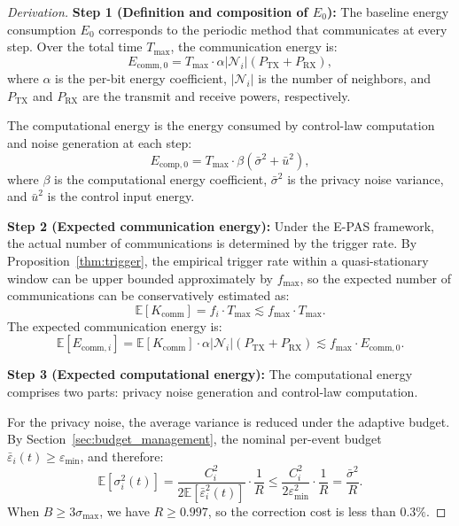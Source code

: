\documentclass[10pt]{article}
\newcommand{\EPAS}{E-PAS}
\newcommand{\fmax}{f_{\max}}
\begin{document}
\begin{proof}[Derivation]
\textbf{Step 1 (Definition and composition of $E_0$):}
The baseline energy consumption $E_0$ corresponds to the periodic method that communicates at every step. Over the total time $T_{\max}$, the communication energy is:
\begin{equation}
  E_{\mathrm{comm},0} = T_{\max} \cdot \alpha|\mathcal{N}_i|(P_{\mathrm{TX}}+P_{\mathrm{RX}}),
\end{equation}
where $\alpha$ is the per-bit energy coefficient, $|\mathcal{N}_i|$ is the number of neighbors, and $P_{\mathrm{TX}}$ and $P_{\mathrm{RX}}$ are the transmit and receive powers, respectively.

The computational energy is the energy consumed by control-law computation and noise generation at each step:
\begin{equation}
  E_{\mathrm{comp},0} = T_{\max} \cdot \beta(\bar{\sigma}^2 + \bar{u}^2),
\end{equation}
where $\beta$ is the computational energy coefficient, $\bar{\sigma}^2$ is the privacy noise variance, and $\bar{u}^2$ is the control input energy.

\textbf{Step 2 (Expected communication energy):}
Under the \EPAS{} framework, the actual number of communications is determined by the trigger rate. By Proposition~\ref{thm:trigger}, the empirical trigger rate within a quasi-stationary window can be upper bounded approximately by $\fmax$, so the expected number of communications can be conservatively estimated as:
\begin{equation}
  \mathbb{E}[K_{\mathrm{comm}}] = f_i \cdot T_{\max} \lesssim \fmax \cdot T_{\max}.
\end{equation}
The expected communication energy is:
\begin{equation}\label{eq:E_comm}
  \mathbb{E}[E_{\mathrm{comm},i}] = \mathbb{E}[K_{\mathrm{comm}}] \cdot \alpha|\mathcal{N}_i|(P_{\mathrm{TX}}+P_{\mathrm{RX}}) \lesssim \fmax \cdot E_{\mathrm{comm},0}.
\end{equation}

\textbf{Step 3 (Expected computational energy):}
The computational energy comprises two parts: privacy noise generation and control-law computation.

For the privacy noise, the average variance is reduced under the adaptive budget. By Section~\ref{sec:budget_management}, the nominal per-event budget $\bar{\varepsilon}_i(t) \geq \varepsilon_{\min}$, and therefore:
\begin{equation}
  \mathbb{E}[\sigma_i^2(t)] = \frac{C_i^2}{2\mathbb{E}[\bar{\varepsilon}_i^2(t)]} \cdot \frac{1}{R} \leq \frac{C_i^2}{2\varepsilon_{\min}^2} \cdot \frac{1}{R} = \frac{\bar{\sigma}^2}{R}.
\end{equation}
When $B \geq 3\sigma_{\max}$, we have $R \geq 0.997$, so the correction cost is less than $0.3\%$.


\end{proof}
\end{document}
